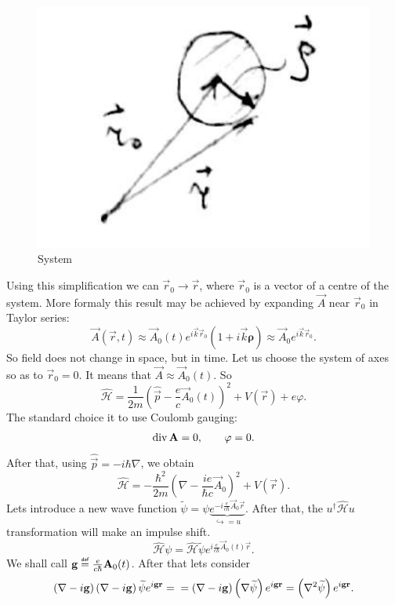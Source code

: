\begin{figure}[h!]
	\centering
	\includegraphics[width=0.3\linewidth]{fig/L4/simply}
	\caption{System}
	\label{fig:simply}
\end{figure}


Using this simplification we can $\vec{r}_0 \to \vec{r}$, where $\vec{r}_0$ is a vector of a centre of the system. More formaly this result may be achieved by expanding $\vec{A}$ near $\vec{r}_0$ in Taylor series:
\begin{equation}
	\vec{A} (\vec{r},t) \approx \vec{A}_0 (t) e^{i \vec{k} \vec{r}_0} \left( 1 + i \vec{k} \bm{\rho} \right) \approx \vec{A}_0 e^{i \vec{k} \vec{r}_0}.
\end{equation} 
So field does not change in space, but in time. Let us choose the system of axes so as to $\vec{r}_0 = 0$. It means that $\vec{A} \approx \vec{A}_0 (t)$. So
\begin{equation}
	\hat{\mathscr{H}} = \frac{1}{2m} \left( \hat{\vec{p}}  - \frac{e}{c} \vec{A}_0(t) \right)^2 + V (\vec{r}) + e \varphi.
\end{equation}
The standard choice it to use Coulomb gauging:
\begin{equation}
	\Div \vec{A} = 0, \qquad \varphi = 0.
\end{equation}
After that, using $\hat{\vec{p}} = -i \hbar \nabla$, we obtain
\begin{equation}
	\hat{\mathscr{H}} = - \frac{\hbar^2}{2m} \left( \nabla - \frac{i e}{\hbar c} \vec{A}_0  \right)^2 + V(\vec{r}).
\end{equation}
Lets introduce a new wave function $\widetilde{\psi} = \psi \underbrace{e^{- i \frac{e}{c \hbar} \vec{A}_0 \vec{r}}}_{\hookrightarrow = u}$. After that, the $ u^{\dagger} \hat{\mathscr{H}} u $ transformation will make an impulse shift.
\begin{equation}
	\hat{\mathscr{H}} \psi = \hat{\mathscr{H}} \widetilde{\psi} e^{i \frac{e}{c \hbar} \vec{A}_0 (t) \vec{r}}.
\end{equation}
We shall call $\vec{g} \myeq \frac{e}{c \hbar} \vec{A}_0 (t)$. After that lets consider
\begin{equation}
	\left( \nabla - i \vec{g} \right) \left( \nabla - i \vec{g} \right) \widetilde{\psi} e^{i \vec{g} \vec{r}} = \\ = \left( \nabla - i \vec{g} \right) \left( \nabla \widetilde{\psi}  \right) e^{i \vec{g} \vec{r}} = \left( \nabla^2 \widetilde{\psi} \right) e^{i \vec{g} \vec{r}}.
\end{equation}
